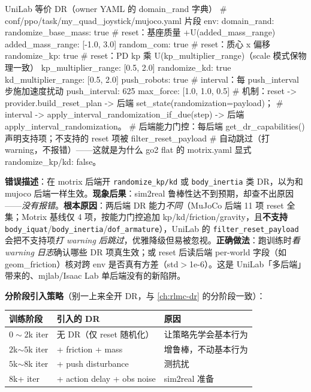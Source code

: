 \begin{codebox}[Python]{UniLab 等价 DR（owner YAML 的 domain\_rand 字典）}
# conf/ppo/task/my_quad_joystick/mujoco.yaml 片段
env:
  domain_rand:
    randomize_base_mass: true          # reset：基座质量 +U(added_mass_range)
    added_mass_range: [-1.0, 3.0]
    random_com: true                   # reset：质心 x 偏移
    randomize_kp: true                 # reset：PD kp 乘 U(kp_multiplier_range)（scale 模式保物理一致）
    kp_multiplier_range: [0.5, 2.0]
    randomize_kd: true
    kd_multiplier_range: [0.5, 2.0]
    push_robots: true                  # interval：每 push_interval 步施加速度扰动
    push_interval: 625
    max_force: [1.0, 1.0, 0.5]
# 机制：reset -> provider.build_reset_plan -> 后端 set_state(randomization=payload)；
#       interval -> apply_interval_randomization_if_due(step) -> 后端 apply_interval_randomization。
# 后端能力门控：每后端 get_dr_capabilities() 声明支持项；不支持的 reset 项被 filter_reset_payload
#   自动跳过（打 warning，不报错）——这就是为什么 go2 flat 的 motrix.yaml 显式 randomize_kp/kd: false。
\end{codebox}

\begin{pitfall}
\textbf{错误描述}：在 motrix 后端开 \verb|randomize_kp/kd| 或 \verb|body_inertia| 类 DR，以为和 mujoco 后端一样生效。\textbf{现象后果}：sim2real 鲁棒性达不到预期，却查不出原因——\emph{没有报错}。\textbf{根本原因}：两后端 DR 能力\emph{不同}（MuJoCo 后端 11 项 reset 全集；Motrix 基线仅 4 项，按能力门控追加 kp/kd/friction/gravity，且\textbf{不支持} \verb|body_iquat|/\verb|body_inertia|/\verb|dof_armature|），UniLab 的 \verb|filter_reset_payload| 会把不支持项\emph{打 warning 后跳过}，优雅降级但易被忽视。\textbf{正确做法}：跑训练时\emph{看 warning 日志}确认哪些 DR 项真生效；或 reset 后读后端 per-world 字段（如 geom\_friction）核对跨 env 是否真有方差（std$>$1e-6）。这是 UniLab「多后端」带来的、mjlab/Isaac Lab 单后端没有的新陷阱。
\end{pitfall}

\textbf{分阶段引入策略}（别一上来全开 DR，与 \cref{ch:rlmc-dr} 的分阶段一致）：

\begin{center}
\small
\begin{tabular}{@{}lp{4.8cm}p{4.4cm}@{}}
\toprule
训练阶段 & 引入的 DR & 原因 \\
\midrule
$0\sim 2$k iter & 无 DR（仅 reset 随机化） & 让策略先学会基本行为 \\
$2$k$\sim 5$k iter & + friction + mass & 增鲁棒，不动基本行为 \\
$5$k$\sim 8$k iter & + push disturbance & 测抗扰 \\
$8$k+ iter & + action delay + obs noise & sim2real 准备 \\
\bottomrule
\end{tabular}
\end{center}

